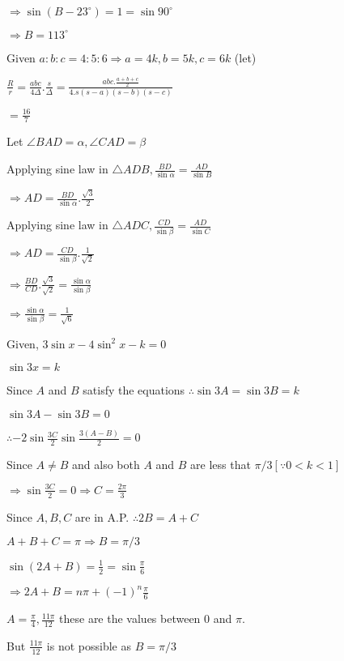   $\Rightarrow \sin(B - 23^\circ) = 1 = \sin90^\circ$

  $\Rightarrow B = 113^\circ$

\item Given $a:b:c = 4:5:6 \Rightarrow a = 4k, b = 5k, c = 6k$ (let)

  $\frac{R}{r} = \frac{abc}{4\Delta}.\frac{s}{\Delta} = \frac{abc.\frac{a + b + c}{2}}{4.s(s - a)(s - b)(s - c)}$

  $= \frac{16}{7}$

\item Let $\angle BAD = \alpha, \angle CAD = \beta$

  Applying sine law in $\triangle ADB, \frac{BD}{\sin\alpha} = \frac{AD}{\sin B}$

  $\Rightarrow AD = \frac{BD}{\sin\alpha}.\frac{\sqrt{3}}{2}$

  Applying sine law in $\triangle ADC, \frac{CD}{\sin\beta} = \frac{AD}{\sin C}$

  $\Rightarrow AD = \frac{CD}{\sin\beta}.\frac{1}{\sqrt{2}}$

  $\Rightarrow \frac{BD}{CD}.\frac{\sqrt{3}}{\sqrt{2}} = \frac{\sin\alpha}{\sin\beta}$

  $\Rightarrow \frac{\sin\alpha}{\sin\beta} = \frac{1}{\sqrt{6}}$

\item Given, $3\sin x - 4\sin^2x - k = 0$

  $\sin3x = k$

  Since $A$ and $B$ satisfy the equations $\therefore \sin3A = \sin3B = k$

  $\sin3A - \sin3B = 0$

  $\therefore -2\sin\frac{3C}{2}\sin\frac{3(A - B)}{2} = 0$

  Since $A\neq B$ and also both $A$ and $B$ are less that $\pi/3[\because 0<k<1]$

  $\Rightarrow \sin\frac{3C}{2} = 0 \Rightarrow C = \frac{2\pi}{3}$

\item Since $A,B,C$ are in A.P. $\therefore 2B = A + C$

  $A + B + C = \pi \Rightarrow B = \pi/3$

  $\sin(2A + B) = \frac{1}{2} = \sin\frac{\pi}{6}$

  $\Rightarrow 2A + B = n\pi + (-1)^n\frac{\pi}{6}$

  $A = \frac{\pi}{4},\frac{11\pi}{12}$ these are the values between $0$ and $\pi.$

  But $\frac{11\pi}{12}$ is not possible as $B = \pi/3$

